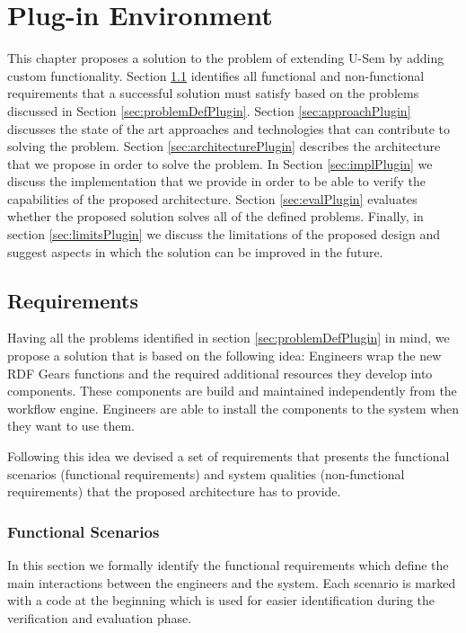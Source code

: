 
\chapter{Plug-in Environment}
\label{cha:plug-in}

This chapter proposes a solution to the problem of extending U-Sem by adding custom functionality. Section \ref{sec:requirementsPlugin} identifies all functional and non-functional requirements that a successful solution must satisfy based on the problems discussed in Section \ref{sec:problemDefPlugin}. Section \ref{sec:approachPlugin} discusses the state of the art approaches and technologies that can contribute to solving the problem. Section \ref{sec:architecturePlugin} describes the architecture that we propose in order to solve the problem. In Section \ref{sec:implPlugin} we discuss the implementation that we provide in order to be able to verify the capabilities of the proposed architecture. Section \ref{sec:evalPlugin} evaluates whether the proposed solution solves all of the defined problems. Finally, in section \ref{sec:limitsPlugin} we discuss the limitations of the proposed design and suggest aspects in which the solution can be improved in the future.

\section{Requirements}
\label{sec:requirementsPlugin}

Having all the problems identified in section \ref{sec:problemDefPlugin} in mind, we propose a solution that is based on the following idea: Engineers wrap the new RDF Gears functions and the required additional resources they develop into components. These components are build and maintained independently from the workflow engine. Engineers are able to install the components to the system when they want to use them.

Following this idea we devised a set of requirements that presents the functional scenarios (functional requirements) and system qualities (non-functional requirements) that the proposed architecture has to provide.

\subsection{Functional Scenarios}
In this section we formally identify the functional requirements which define the main interactions between the engineers and the system. Each scenario is marked with a code at the beginning which is used for easier identification during the verification and evaluation phase.


